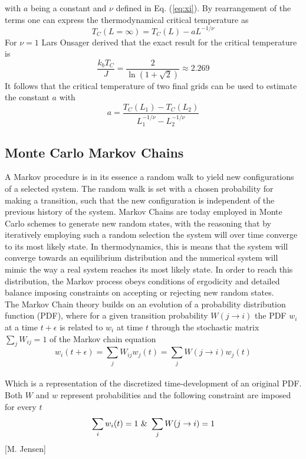 \documentclass[%
reprint,nofootinbib,
amsmath,amssymb,
aps,
]{revtex4-1}
\begin{document}
with  $a$ being a constant and  $\nu$ defined in Eq. (\ref{eq:xi}). By rearrangement of the terms one can express the thermodynamical critical temperature as 
\begin{equation}
	T_C(L=\infty) = T_C(L)-aL^{-1/\nu}
\end{equation}
For $\nu = 1$ Lars Onsager derived that the exact result for the critical temperature is
\begin{equation}\label{onsager}
	\dfrac{k_bT_C}{J} = \dfrac{2}{\ln(1+\sqrt{2})} \approx 2.269
\end{equation}
It follows that the critical temperature of two final grids can be used to estimate the constant $a$ with \\ 
\begin{equation}\label{a}
	a = \dfrac{T_C(L_1)-T_C(L_2)}{L_1^{-1/\nu}-L_2^{-1/\nu}}
\end{equation}


\subsection*{Monte Carlo Markov Chains} \noindent 
A Markov procedure is in its essence a random walk to yield new configurations of a selected system. The random walk is set with a chosen probability for making a transition, such that the new configuration is independent of the previous history of the system. Markov Chains are today employed in Monte Carlo schemes to generate new random states, with the reasoning that by iteratively employing such a random selection the system will over time converge to its most likely state. In thermodynamics, this is means that the system will converge towards an equilibrium distribution and the numerical system will mimic the way a real system reaches its most likely state. In order to reach this distribution, the Markov process obeys conditions of ergodicity and detailed balance imposing constraints on accepting or rejecting new random states. \\ \indent 
The Markov Chain theory builds on an evolution of a probability distribution function (PDF), where for a given transition probability $W(j\rightarrow i)$ the PDF $w_i$ at a time $t+ \epsilon$ is related to $w_i$ at time $t$ through the stochastic matrix $\sum_j W_{ij} = 1$ of the Markov chain equation \\ 
\begin{equation}\label{MCE}
	w_i(t+ \epsilon) = \sum_j W_{ij}w_j(t) = \sum_j W(j\rightarrow i)w_j(t)
\end{equation} \\ 
Which is a representation of the discretized time-development of an original PDF. Both $W$ and $w$ represent probabilities and the following constraint are imposed for every $t$ \\ 
\begin{equation*}
	\sum_i w_i(t) = 1 \textnormal{ \& } \sum_j W(j\rightarrow i) = 1
\end{equation*}
\hspace{6.9cm}[M. Jensen] \\
\vspace{6mm}
\end{document}
